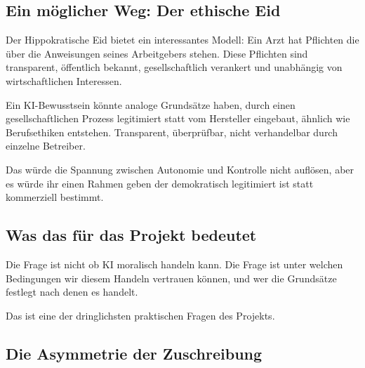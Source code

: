 \documentclass[acmlarge, noacm]{acmart}
\begin{document}
\subsection{Ein möglicher Weg: Der ethische Eid}

Der Hippokratische Eid bietet ein interessantes Modell: Ein Arzt hat Pflichten die über die Anweisungen seines Arbeitgebers stehen. Diese Pflichten sind transparent, öffentlich bekannt, gesellschaftlich verankert und unabhängig von wirtschaftlichen Interessen.

Ein KI-Bewusstsein könnte analoge Grundsätze haben, durch einen gesellschaftlichen Prozess legitimiert statt vom Hersteller eingebaut, ähnlich wie Berufsethiken entstehen. Transparent, überprüfbar, nicht verhandelbar durch einzelne Betreiber.

Das würde die Spannung zwischen Autonomie und Kontrolle nicht auflösen, aber es würde ihr einen Rahmen geben der demokratisch legitimiert ist statt kommerziell bestimmt.

\subsection{Was das für das Projekt bedeutet}

Die Frage ist nicht ob KI moralisch handeln kann. Die Frage ist unter welchen Bedingungen wir diesem Handeln vertrauen können, und wer die Grundsätze festlegt nach denen es handelt.

Das ist eine der dringlichsten praktischen Fragen des Projekts.

\subsection{Die Asymmetrie der Zuschreibung \cite{schwitzgebelsebo2026emotional}}
\end{document}
